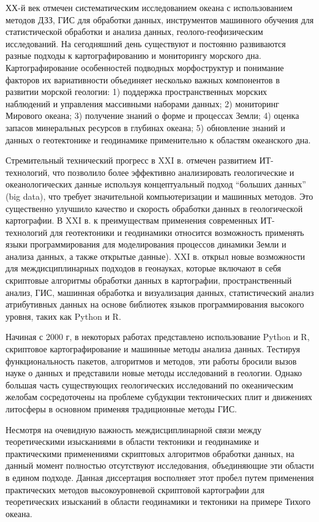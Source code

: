 ХХ-й век отмечен систематическим исследованием океана с использованием методов ДЗЗ, ГИС для обработки данных, инструментов машинного обучения для статистической обработки и анализа данных, геолого-геофизическим исследований. На сегодняшний день существуют и постоянно развиваются разные подходы к картографированию и мониторингу морского дна. Картографирование особенностей подводных морфоструктур и понимание факторов их вариативности объединяет несколько важных компонентов в развитии морской геологии: 1) поддержка пространственных морских наблюдений и управления массивными наборами данных; 2) мониторинг Мирового океана; 3) получение знаний о форме и процессах Земли; 4) оценка запасов минеральных ресурсов в глубинах океана; 5) обновление знаний и данных о геотектонике и геодинамике применительно к областям океанского дна.

Стремительный технический прогресс в XXI в. отмечен развитием ИТ-технологий, что позволило более эффективно анализировать геологические и океанологических данные используя концептуальный подход “больших данных” (big data), что требует значительной компьютеризации и машинных методов. Это существенно улучшило качество и скорость обработки данных в геологической картографии. В XXI в. к преимуществам применения современных ИТ-технологий для геотектоники и геодинамики относится возможность применять языки программирования для моделирования процессов динамики Земли и анализа данных, а также открытые данные). XXI в. открыл новые возможности для междисциплинарных подходов в геонауках, которые включают в себя скриптовые алгоритмы обработки данных в картографии, пространственный анализ, ГИС, машинная обработка и визуализация данных, статистический анализ атрибутивных данных на основе библиотек языков программирования высокого уровня, таких как Python и R. 

Начиная с 2000 г, в некоторых работах представлено использование Python и R, скриптовое картографирование и машинные методы анализа данных. Тестируя функциональность пакетов, алгоритмов и методов, эти работы бросили вызов науке о данных и представили новые методы исследований в геологии. Однако большая часть существующих геологических исследований по океаническим желобам сосредоточены на проблеме субдукции тектонических плит и движениях литосферы в основном применяя традиционные методы ГИС. 

Несмотря на очевидную важность междисциплинарной связи между теоретическими изысканиями в области тектоники и геодинамике и практическими применениями скриптовых алгоритмов обработки данных, на данный момент полностью отсутствуют исследования, объединяющие эти области в едином подходе. Данная диссертация восполняет этот пробел путем применения практических методов высокоуровневой скриптовой картографии для теоретических изысканий в области геодинамики и тектоники на примере Тихого океана. 

